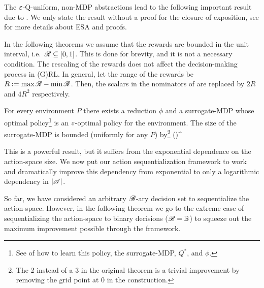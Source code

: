 \documentclass{article} %
\let\thmOrg\theorem
\let\endthmOrg\endtheorem
\renewenvironment{theorem}{\begin{tcolorbox}\thmOrg}{\endthmOrg\end{tcolorbox}}
\begin{document}
The $\varepsilon$-Q-uniform, non-MDP abstractions lead to the following important result due to \citet{Hutter2016}. We only state the result without a proof for the closure of exposition, see \citet{Hutter2016} for more details about ESA and proofs.

In the following theorems we assume that the rewards are bounded in the unit interval, i.e.\ $\mathscr{R} \subseteq [0,1]$. This is done for brevity, and it is not a necessary condition. The rescaling of the rewards does not affect the decision-making process in (G)RL. In general, let the range of the rewards be $R := \max \mathscr{R} - \min \mathscr{R}$. Then, the scalars in the nominators of  are replaced by $2R$ and $4R^2$ respectively.

\begin{theorem}[ESA {\cite[Theorem 11]{Hutter2016}}] \label{thm:esa}
For every environment $P$ there exists a reduction $\phi$ and a surrogate-MDP whose optimal policy\footnote{See \citet{Hutter2016} of how to learn this policy, the surrogate-MDP, $Q^*$, and $\phi$.} is an $\varepsilon$-optimal policy for the environment. The size of the surrogate-MDP is bounded (uniformly for any $P$) by\footnote{The 2 instead of a 3 in the original theorem is a trivial improvement by removing the grid point at 0 in the construction.}
\beqn
\abs{\S} \leq \left(\right)^{\abs{\A}}
\eeqn
\end{theorem}

This is a powerful result, but it suffers from the exponential dependence on the action-space size. We now put our action sequentialization framework to work and dramatically improve this dependency from exponential to only a logarithmic dependency in ${\left\lvert\mathscr{A}\right\rvert}$.

So far, we have considered an arbitrary $\mathscr{B}$-ary decision set to sequentialize the action-space. However, in the following theorem we go to the extreme case of sequentializing the action-space to binary decisions ($\mathscr{B} = \mathbb{B}$) to squeeze out the maximum improvement possible through the framework.
\end{document}
